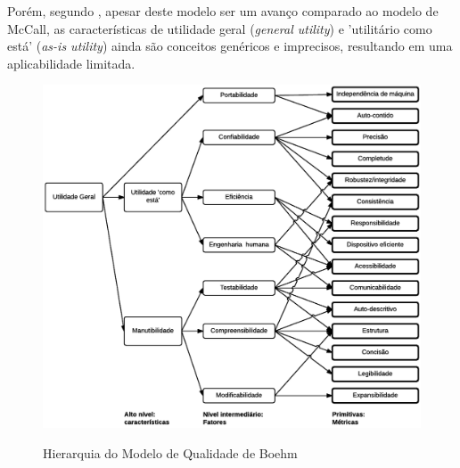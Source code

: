 \documentclass[
	12pt,				%
	openright,			%
	oneside,			%
	a4paper,			%
	english,			%
	brazil,				%
	]{abntex2}
\begin{document}
Porém, segundo , apesar deste modelo ser um avanço comparado ao modelo de McCall, as características de utilidade geral (\emph{general utility}) e 'utilitário como está' (\emph{as-is utility}) ainda são conceitos genéricos e imprecisos, resultando em uma aplicabilidade limitada.

\begin{figure}[H]
    \centering
    \caption{Hierarquia do Modelo de Qualidade de Boehm}
    \graphicspath{ {./graphics/} }
    \includegraphics[scale=0.95]{boehm-hierarquia_modelo-andrei}
    \label{fig:boehm-hierarquia_modelo}
\end{figure}


\end{document}
